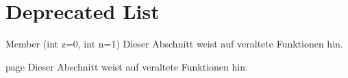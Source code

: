 \chapter{Deprecated List}
\hypertarget{deprecated}{}\label{deprecated}

\begin{DoxyRefList}
\item[Member \doxylink{class_bruch_a05e1f4aae8cd7c722c09d2539f177ce3}{Bruch\+::Bruch} (int z=0, int n=1)]\label{deprecated__deprecated000001}%
%
Dieser Abschnitt weist auf veraltete Funktionen hin. 
\item[page \doxylink{index}{New\+Tec Dokumentation} ]\label{deprecated__deprecated000002}%
%
Dieser Abschnitt weist auf veraltete Funktionen hin.
\end{DoxyRefList}